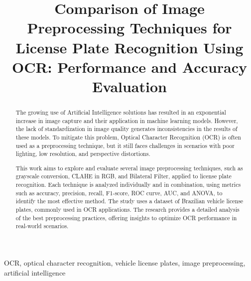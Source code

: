 \documentclass[conference]{IEEEtran}
\begin{document}
	
	\title{Comparison of Image Preprocessing Techniques for License Plate Recognition Using OCR: Performance and Accuracy Evaluation}
	
	\author{
		
		\and
		}
	
	\maketitle
	
	\begin{abstract}
		The growing use of Artificial Intelligence solutions has resulted in an exponential increase in image capture and their application in machine learning models. However, the lack of standardization in image quality generates inconsistencies in the results of these models. To mitigate this problem, Optical Character Recognition (OCR) is often used as a preprocessing technique, but it still faces challenges in scenarios with poor lighting, low resolution, and perspective distortions.
		
		This work aims to explore and evaluate several image preprocessing techniques, such as grayscale conversion, CLAHE in RGB, and Bilateral Filter, applied to license plate recognition. Each technique is analyzed individually and in combination, using metrics such as accuracy, precision, recall, F1-score, ROC curve, AUC, and ANOVA, to identify the most effective method. The study uses a dataset of Brazilian vehicle license plates, commonly used in OCR applications. The research provides a detailed analysis of the best preprocessing practices, offering insights to optimize OCR performance in real-world scenarios.
	\end{abstract}
	
	\begin{IEEEkeywords} 
		OCR, optical character recognition, vehicle license plates, image preprocessing, artificial intelligence
	\end{IEEEkeywords}
	
\end{document}

